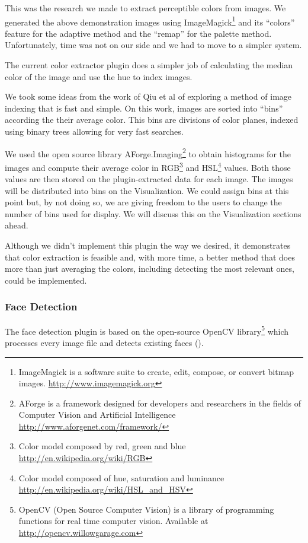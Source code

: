 This was the research we made to extract perceptible colors from images. We generated the above demonstration images using ImageMagick\footnote{ImageMagick is a software suite to create, edit, compose, or convert bitmap images. \url{http://www.imagemagick.org}} and its ``colors'' feature for the adaptive method and the ``remap'' for the palette method. Unfortunately, time was not on our side and we had to move to a simpler system. 

The current color extractor plugin does a simpler job of calculating the median color of the image and use the hue to index images.

We took some ideas from the work of Qiu et al\cite{Qiu:2007p1207} of exploring a method of image indexing that is fast and simple. On this work, images are sorted into ``bins'' according the their average color. This bins are divisions of color planes, indexed using binary trees allowing for very fast searches.

We used the open source library AForge.Imaging\footnote{AForge is a framework designed for developers and researchers in the fields of Computer Vision and Artificial Intelligence \url{http://www.aforgenet.com/framework/}} to obtain histograms for the images and compute their average color in RGB\footnote{Color model composed by red, green and blue \url{http://en.wikipedia.org/wiki/RGB}} and HSL\footnote{Color model composed of hue, saturation and luminance \url{http://en.wikipedia.org/wiki/HSL_and_HSV}} values. Both those values are then stored on the plugin-extracted data for each image. The images will be distributed into bins on the Visualization. We could assign bins at this point but, by not doing so, we are giving freedom to the users to change the number of bins used for display. We will discuss this on the Visualization sections ahead.


Although we didn't implement this plugin the way we desired, it demonstrates that color extraction is feasible and, with more time, a better method that does more than just averaging the colors, including detecting the most relevant ones, could be implemented.



\subsubsection{Face Detection} %
\label{ssub:face_detection}

The face detection plugin is based on the open-source OpenCV library\footnote{OpenCV (Open Source Computer Vision) is a library of programming functions for real time computer vision. Available at \url{http://opencv.willowgarage.com}} which processes every image file and detects existing faces ().
 
